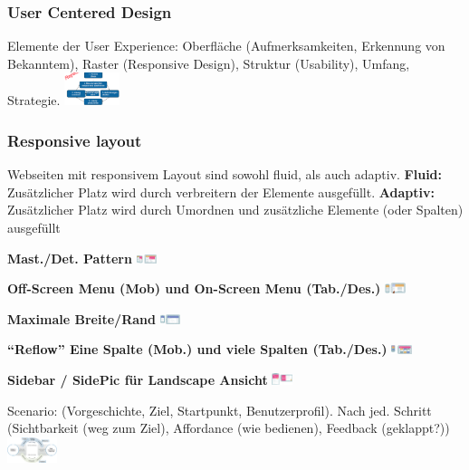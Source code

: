 \begin{multicols*}{4}
\begin{multicols}{2}
\subsubsection{User Centered Design}
Elemente der User Experience: Oberfläche (Aufmerksamkeiten, 
Erkennung von Bekanntem), Raster (Responsive Design), Struktur (Usability), 
Umfang, Strategie.
\includegraphics[width=0.12\textwidth]{images/ucd}
\subsubsection{Responsive layout}
Webseiten mit responsivem Layout sind sowohl fluid, als auch adaptiv.
 \textbf{Fluid:} Zusätzlicher Platz wird durch verbreitern der Elemente ausgefüllt. 
\textbf{Adaptiv:} Zusätzlicher Platz wird durch Umordnen und zusätzliche Elemente (oder Spalten) ausgefüllt
\end{multicols}
\begin{multicols}{5}
  \textbf{Mast./Det. Pattern}
  \includegraphics[width=0.045\textwidth]{images/master}
  
  \textbf{Off-Screen Menu (Mob) und On-Screen Menu (Tab./Des.)}
  \includegraphics[width=0.045\textwidth]{images/offscreen}
  
  \textbf{Maximale Breite/Rand}
    \includegraphics[width=0.045\textwidth]{images/maxbreite}
    
  \textbf{“Reflow” Eine Spalte (Mob.) und viele Spalten (Tab./Des.)}
   \includegraphics[width=0.045\textwidth]{images/reflow}
   
  \textbf{Sidebar / SidePic für Landscape Ansicht}
  \includegraphics[width=0.045\textwidth]{images/landscape}
\end{multicols}
\begin{multicols}{2}
  Scenario: (Vorgeschichte, Ziel, Startpunkt, Benutzerprofil).
  Nach jed. Schritt (Sichtbarkeit (weg zum Ziel), 
  Affordance (wie bedienen), Feedback (geklappt?))
  \vfill
  \columnbreak
  \includegraphics[width=0.11\textwidth]{images/stone}
\end{multicols}



\end{multicols*}
